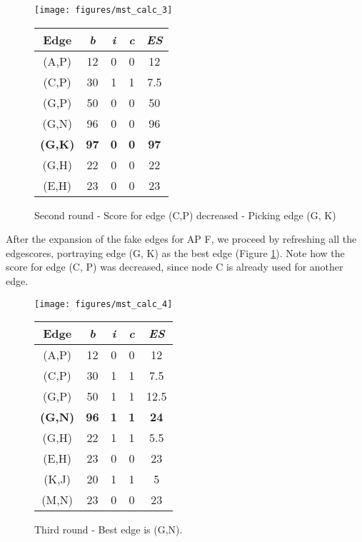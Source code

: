 	\begin{figure}[h!]
	  \centering
	  \begin{minipage}{7.5cm}
	    \texttt{[image: figures/mst\_calc\_3]}
	  \end{minipage}
	  \begin{minipage}{4cm}
	    \begin{tabular}{c||c|c|c||c}
	      Edge & \textit{b} & \textit{i} & \textit{c} & \textit{ES}\\ \hline\hline
	      (A,P) & 12 & 0 & 0 & 12 \\ \hline
	      (C,P) & 30 & 1 & 1 & 7.5 \\ \hline
	      (G,P) & 50 & 0 & 0 & 50 \\ \hline
	      (G,N) & 96 & 0 & 0 & 96 \\ \hline
	      \textbf{(G,K)} & \textbf{97} & \textbf{0} & \textbf{0} & \textbf{97} \\ \hline
	      (G,H) & 22 & 0 & 0 & 22 \\ \hline
	      (E,H) & 23 & 0 & 0 & 23 \\ \hline
	    \end{tabular}
	  \end{minipage}
	\caption{Second round - Score for edge (C,P) decreased - Picking edge (G, K)}
	\label{fig:mst_calc_3}
      \end{figure}

      After the expansion of the fake edges for \ac{AP} F, we proceed by refreshing all the edgescores, 
      portraying edge (G, K) as the best edge (Figure \ref{fig:mst_calc_3}).
      Note how the score for edge (C, P) was decreased, since node C is already used for another edge.
      
      \begin{figure}[h!]
	\centering
	\begin{minipage}{7.5cm}
	  \texttt{[image: figures/mst\_calc\_4]}
	\end{minipage}
	\begin{minipage}{4cm}
	  \begin{tabular}{c||c|c|c||c}
	    Edge & \textit{b} & \textit{i} & \textit{c} & \textit{ES}\\ \hline\hline
	    (A,P) & 12 & 0 & 0 & 12 \\ \hline
	    (C,P) & 30 & 1 & 1 & 7.5 \\ \hline
	    (G,P) & 50 & 1 & 1 & 12.5 \\ \hline
	    \textbf{(G,N)} & \textbf{96} & \textbf{1} & \textbf{1} & \textbf{24} \\ \hline
	    (G,H) & 22 & 1 & 1 & 5.5 \\ \hline
	    (E,H) & 23 & 0 & 0 & 23 \\ \hline
	    (K,J) & 20 & 1 & 1 & 5 \\ \hline
	    (M,N) & 23 & 0 & 0 & 23 \\ \hline
	  \end{tabular}
	\end{minipage}
	\caption{Third round - Best edge is (G,N).}
	\label{fig:mst_calc_4}
      \end{figure}
      
